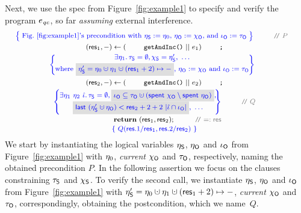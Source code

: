 Next, we use the spec from Figure~\ref{fig:example1} to specify and
verify the program $e_{\mathit{qc}}$, so far \emph{assuming} external
interference.
%
\[
\!\!\!
{\small{
\begin{array}{c}
\!\!\!\!\!
\spec{\!\!
  \begin{array}{c}
    \mbox{Fig.~\ref{fig:example1}'s precondition with $\gists := \gist_0$, $\gisto :=
      \histo$, and $\ikno := \tkno$}
  \end{array}
  \!\!}
  ~\comm{P}
  \\\\[-6pt]
  (\res_1, -) \Asgn (\esc{getAndInc()} ~||~ e_1) \esc{;}
  \\[3pt]
\!\!\!\!{{
\spec{\!\!\!\!
\begin{array}{c}
 \exists \gist_1\ldot \tkns = \emptyset\aand \hists = \gists',~\ldots
\\[2pt]
\mbox{where 
 $\gbm{\gists' = \gist_0 \hunion
\gist_1 \hunion (\res_1 + 2)\mapsto -}$, $\gisto := \histo$ and $\ikno :=
\tkno$} 
  \end{array}
\!\!\!\!}
}}
%
\\\\[-5pt]
(\res_2, -) \Asgn (\esc{getAndInc()} ~||~ e_2) \esc{;}      
\\[3pt]
\spec{\!\!\!\!
\begin{array}{c}
\exists \gist_1~\gist_2~\iknh \ldot     
%
\tkns = \emptyset \aand 
\gbm{\ikno \subseteq \tkno \hunion (\Tomb~\histo \setminus \Tomb~\gisto)},\\[1pt]
\gbm{\last~(\gists' \hunion \gisto) < \res_2 + 2 + 2~|\iknh \cap \ikno|},~\ldots 
\end{array}
\!\!\!\!\!}~\comm{Q}
\\\\[-7pt]
~~~~~~~~~~~\kw{return}~(\res_1, \res_2); ~\comm{=: \res} 
\\[2pt]
\spec{~Q(\res.1/\res_1, \res.2/\res_2)~} %
\end{array}
}} 
\]
%
We start by instantiating the logical variables $\eta_{\mathsf{S}}$, $\eta_{\mathsf{O}}$ and
$\iota_{\mathsf{O}}$ from Figure~\ref{fig:example1} with $\eta_0$, \emph{current}
$\chi_{\mathsf{O}}$ and $\tau_{\mathsf{O}}$, respectively, naming the obtained precondition
$P$.
%
In the following assertion we focus on the clauses constraining
$\tau_{\mathsf{S}}$ and $\chi_{\mathsf{S}}$. To verify the second call, we instantiate
$\eta_{\mathsf{S}}$, $\eta_{\mathsf{O}}$ and $\iota_{\mathsf{O}}$ from Figure~\ref{fig:example1} with
$\gists' = \gist_0 \hunion \gist_1 \hunion (\res_1 + 2)\mapsto -$,
\emph{current} $\chi_{\mathsf{O}}$ and $\tau_{\mathsf{O}}$, correspondingly, obtaining the
postcondition, which we name~$Q$.

